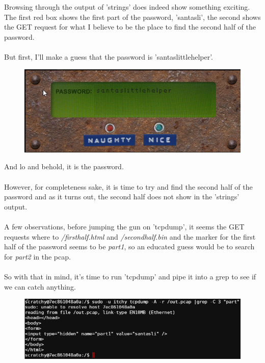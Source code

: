 \documentclass[writeup.tex]{subfiles}
\begin{document}
			Browsing through the output of 'strings' does indeed show something exciting. The first red box shows the first part of the password, 'santasli', the second shows the GET request for what I believe to be the place to find the second half of the password.\\
			\\
			But first, I'll make a guess that the password is 'santaslittlehelper'.
			\begin{figure}[H]
				\centering
				\includegraphics[scale=1]{"screenshots/doors/Door code 1"}
			\end{figure}
		
			And lo and behold, it is the password.\\
			\\
			However, for completeness sake, it is time to try and find the second half of the password and as it turns out, the second half does not show in the 'strings' output.\\
			\\
			A few observations, before jumping the gun on 'tcpdump', it seems the GET requests where to \textit{/firsthalf.html} and \textit{/secondhalf.bin} and the marker for the first half of the password seems to be \textit{part1}, so an educated guess would be to search for \textit{part2} in the pcap.\\
			\\
			So with that in mind, it's time to run 'tcpdump' and pipe it into a grep to see if we can catch anything. 
			
			\begin{figure}[H]
				\centering
				\includegraphics[width=\linewidth]{"screenshots/terminals/Terminal 1 - tcpdump grep pt 1"}
			\end{figure}
			
\end{document}
